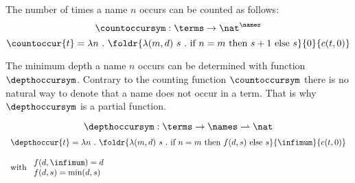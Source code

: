\begin{definition}[$\countoccur{x}$]
  The number of times a name $n$ occurs can be counted as follows:
  \[ \countoccursym : \terms \rightarrow \nat^{\names} \]
  \[ \countoccur{t} = \lambda n ~.~ \foldr{\lambda (m, d)~s ~.~ \text{if~} n = m \text{~then~} s+1 \text{~else~} s}{0}{c(t, 0)} \]
\end{definition}

\begin{definition}[$\depthoccur{x}$]
  The minimum depth a name $n$ occurs can be determined with function $\depthoccursym$.
  Contrary to the counting function $\countoccursym$ there is no natural way to denote that a name does
  not occur in a term.
  That is why $\depthoccursym$ is a partial function.
  
  \[ \depthoccursym : \terms \rightarrow \names \rightharpoonup \nat \]
  \[
    \begin{array}{l}
      \depthoccur{t} = \lambda n ~.~ \foldr{\lambda (m, d)~s ~.~ \text{if~} n = m \text{~then~} f(d, s) \text{~else~} s}{\infimum}{c(t, 0)} \\
      \\
      \text{with~} \begin{array}{l}
        f(d, \infimum) = d \\
        f(d, s) = \text{min}(d, s) \\
      \end{array}
    \end{array}
  \]
\end{definition}
